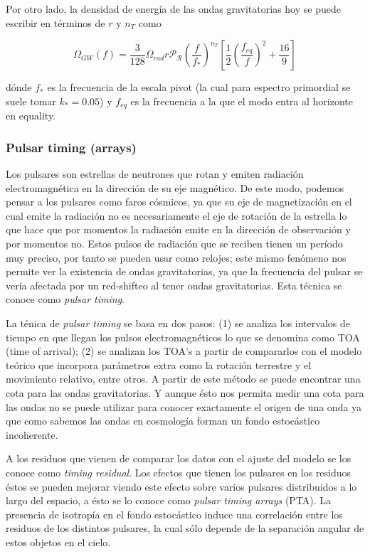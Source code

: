 Por otro lado, la densidad de energía de las ondas gravitatorias hoy se puede escribir en términos de $r$ y $n_T$ como

\begin{equation}
    \Omega_{GW} (f) = \frac{3}{128} \Omega_{rad} r \mathcal{P}_\mathcal{R} \left( \frac{f}{f_*} \right)^{n_T} \left[ \frac{1}{2} \left( \frac{f_{eq}}{f} \right)^2 + \frac{16}{9} \right]
\end{equation}

\noindent
dónde $f_*$ es la frecuencia de la escala pivot (la cual para espectro primordial se suele tomar $k_* = 0.05$) y $f_{eq}$ es la frecuencia a la que el modo entra al horizonte en equality.

\subsubsection{Pulsar timing (arrays)}

Los pulsares son estrellas de neutrones que rotan y emiten radiación electromagnética en la dirección de su eje magnético. De este modo, podemos pensar a los pulsares como faros cósmicos, ya que su eje de magnetización en el cual emite la radiación no es necesariamente el eje de rotación de la estrella lo que hace que por momentos la radiación emite en la dirección de observación y por momentos no. Estos pulsos de radiación que se reciben tienen un período muy preciso, por tanto se pueden usar como relojes; este mismo fenómeno nos permite ver la existencia de ondas gravitatorias, ya que la frecuencia del pulsar se vería afectada por un red-shifteo al tener ondas gravitatorias. Esta técnica se conoce como \textit{pulsar timing}.

La ténica de \textit{pulsar timing} se basa en dos pasos: (1) se analiza los intervalos de tiempo en que llegan los pulsos electromagnéticos lo que se denomina como TOA (time of arrival); (2) se analizan los TOA's a partir de compararlos con el modelo teórico que incorpora parámetros extra como la rotación terrestre y el movimiento relativo, entre otros. A partir de este método se puede encontrar una cota para las ondas gravitatorias. Y aunque ésto nos permita medir una cota para las ondas no se puede utilizar para conocer exactamente el origen de una onda ya que como sabemos las ondas en cosmología forman un fondo estocástico incoherente.

A los residuos que vienen de comparar los datos con el ajuste del modelo se los conoce como \textit{timing residual}. Los efectos que tienen los pulsares en los residuos éstos se pueden mejorar viendo este efecto sobre varios pulsares distribuidos a lo largo del espacio, a ésto se lo conoce como \textit{pulsar timing arrays} (PTA). La presencia de isotropía en el fondo estocástico induce una correlación entre los residuos de los distintos pulsares, la cual sólo depende de la separación angular de estos objetos en el cielo.

